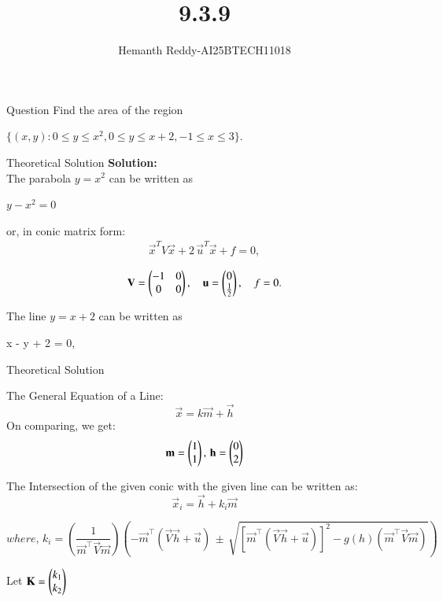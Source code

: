 \documentclass{beamer}
\title %
{9.3.9}
\author %
{Hemanth Reddy-AI25BTECH11018}
\begin{document}
\frame{\titlepage}
\begin{frame}{Question}
Find the area of the region


$
\{(x,y) : 0 \leq y \leq x^2, 0 \leq y \leq x+2, -1 \leq x \leq 3\}.
$
\end{frame}



\begin{frame}{Theoretical Solution}
\textbf{Solution:}\\

The parabola $ y = x^2 $ can be written as\\
\begin{center}
    $y - x^2 = 0$
\end{center}


or, in conic matrix form:
\begin{align}
    \vec{x}^T V \vec{x} + 2\, \vec{u}^T \vec{x} + f = 0,
\end{align}



\begin{align}
    \mathbf{V} = \begin{pmatrix}
-1 & 0 \\
0 & 0
\end{pmatrix}, \quad
\mathbf{u} = \begin{pmatrix}
0 \\ \frac{1}{2}
\end{pmatrix}, \quad
f = 0.
\end{align}



The line \( y = x + 2 \) can be written as\\
\begin{center}
    x - y + 2 = 0,
\end{center}



\end{frame}

\begin{frame}{Theoretical Solution}


The General Equation of a Line:
\begin{equation}
    \vec{x} = k\vec{m} + \vec{h}
\end{equation}
On comparing, we get:
\begin{equation}
    \mathbf{m} = \begin{pmatrix}1 \\ 1\end{pmatrix}, \, \mathbf{h} = \begin{pmatrix}0 \\ 2\end{pmatrix}
\end{equation}

The Intersection of the given conic with the given line can be written as:
\begin{equation}
    \vec{x}_i = \vec{h} + k_i\vec{m}
\end{equation}

\begin{equation}
    where, \, k_i = \left( \dfrac{1}{\vec{m}^\top\vec{V}\vec{m}} \right) \left( 
    -\vec{m}^\top(\vec{V}\vec{h}+\vec{u}) \, \pm \, \sqrt{[\vec{m}^\top(\vec{V}\vec{h}+\vec{u})]^2 - g(h)(\vec{m}^\top\vec{V}\vec{m})} \right) 
\end{equation}

Let $\mathbf{K} = \begin{pmatrix}k_1 \\ k_2\end{pmatrix}$\\




\end{frame}
\end{document}
